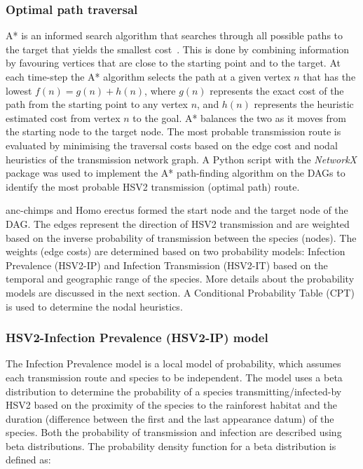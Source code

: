 \documentclass[fleqn,10pt]{wlscirep}
\begin{document}
\subsubsection*{Optimal path traversal}
A* is an informed search algorithm that searches through all possible paths to the target that yields the smallest cost~\citep{Hart1968}. This is done by combining information by favouring vertices that are close to the starting point and to the target. At each time-step the A* algorithm selects the path at a given vertex $n$ that has the lowest $f(n) = g(n) + h(n)$, where $g(n)$ represents the exact cost of the path from the starting point to any vertex $n$, and $h(n)$ represents the heuristic estimated cost from vertex $n$ to the goal. A* balances the two as it moves from the starting node to the target node. The most probable transmission route is evaluated by minimising the traversal costs based on the edge cost and nodal heuristics of the transmission network graph. A Python script with the \textit{NetworkX} package was used to implement the A* path-finding algorithm on the DAGs to identify the most probable HSV2 transmission (optimal path) route.

anc-chimps and Homo erectus formed the start node and the target node of the DAG. The edges represent the direction of HSV2 transmission and are weighted based on the inverse probability of transmission between the species (nodes). The weights (edge costs) are determined based on two probability models: Infection Prevalence (HSV2-IP) and Infection Transmission (HSV2-IT) based on the temporal and geographic range of the species. More details about the probability models are discussed in the next section. A Conditional Probability Table (CPT) is used to determine the nodal heuristics.
 

\subsubsection*{HSV2-Infection Prevalence (HSV2-IP) model}
The Infection Prevalence model is a local model of probability, which assumes each transmission route and species to be independent. The model uses a beta distribution to determine the probability of a species transmitting/infected-by HSV2 based on the proximity of the species to the rainforest habitat and the duration (difference between the first and the last appearance datum) of the species. Both the probability of transmission and infection are described using beta distributions. The probability density function for a beta distribution is defined as: 
\end{document}

